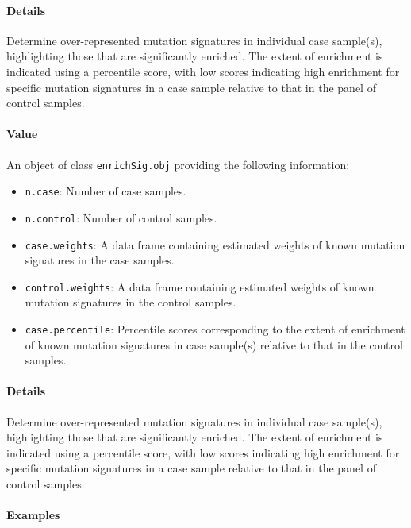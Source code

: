 \documentclass[]{article}
\providecommand{\tightlist}{%
  \setlength{\itemsep}{0pt}\setlength{\parskip}{0pt}}
\let\oldparagraph\paragraph
\renewcommand{\paragraph}[1]{\oldparagraph{#1}\mbox{}}
\begin{document}
\paragraph{\texorpdfstring{\textbf{Details}}{Details}}\label{details-7}

Determine over-represented mutation signatures in individual case
sample(s), highlighting those that are significantly enriched. The
extent of enrichment is indicated using a percentile score, with low
scores indicating high enrichment for specific mutation signatures in a
case sample relative to that in the panel of control samples.

\paragraph{\texorpdfstring{\textbf{Value}}{Value}}\label{value-10}

An object of class \texttt{enrichSig.obj} providing the following
information:

\begin{itemize}
\tightlist
\item
  \texttt{n.case}: Number of case samples.
\item
  \texttt{n.control}: Number of control samples.
\item
  \texttt{case.weights}: A data frame containing estimated weights of
  known mutation signatures in the case samples.
\item
  \texttt{control.weights}: A data frame containing estimated weights of
  known mutation signatures in the control samples.
\item
  \texttt{case.percentile}: Percentile scores corresponding to the
  extent of enrichment of known mutation signatures in case sample(s)
  relative to that in the control samples.
\end{itemize}

\paragraph{\texorpdfstring{\textbf{Details}}{Details}}\label{details-8}

Determine over-represented mutation signatures in individual case
sample(s), highlighting those that are significantly enriched. The
extent of enrichment is indicated using a percentile score, with low
scores indicating high enrichment for specific mutation signatures in a
case sample relative to that in the panel of control samples.

\paragraph{\texorpdfstring{\textbf{Examples}}{Examples}}\label{examples-12}
\end{document}
